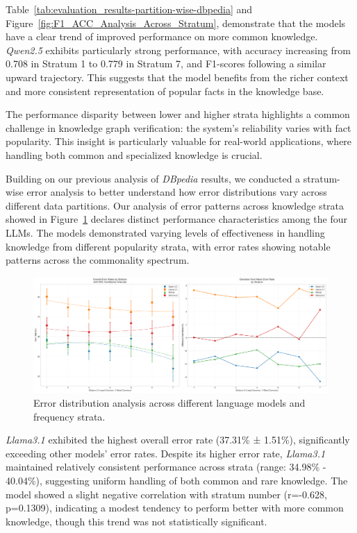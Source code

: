 Table~\ref{tab:evaluation_results-partition-wise-dbpedia} and Figure~\ref{fig:F1_ACC_Analysis_Across_Stratum}, demonstrate that the models have a clear trend of improved performance on more common knowledge.
\textit{Qwen2.5} exhibits particularly strong performance, with accuracy increasing from 0.708 in Stratum 1 to 0.779 in Stratum 7, and F1-scores following a similar upward trajectory.
This suggests that the model benefits from the richer context and more consistent representation of popular facts in the knowledge base.

The performance disparity between lower and higher strata highlights a common challenge in knowledge graph verification: the system's reliability varies with fact popularity.
This insight is particularly valuable for real-world applications, where handling both common and specialized knowledge is crucial.

Building on our previous analysis of \textit{DBpedia} results, we conducted a stratum-wise error analysis to better understand how error distributions vary across different data partitions.
Our analysis of error patterns across knowledge strata showed in Figure~\ref{fig:error_model-comparison_partition-wise} declares distinct performance characteristics among the four LLMs.
The models demonstrated varying levels of effectiveness in handling knowledge from different popularity strata, with error rates showing notable patterns across the commonality spectrum.

\begin{figure}[ht!]
    \centering
    \begin{minipage}[b]{\textwidth}
        \centering
        \includegraphics[width=\textwidth]{res/error_rates_analysis}
    \end{minipage}
    \caption{Error distribution analysis across different language models and frequency strata.}
    \label{fig:error_model-comparison_partition-wise}
\end{figure}

\textit{Llama3.1} exhibited the highest overall error rate (37.31\% ± 1.51\%), significantly exceeding other models' error rates.
Despite its higher error rate, \textit{Llama3.1} maintained relatively consistent performance across strata (range: 34.98\% - 40.04\%), suggesting uniform handling of both common and rare knowledge.
The model showed a slight negative correlation with stratum number (r=-0.628, p=0.1309), indicating a modest tendency to perform better with more common knowledge, though this trend was not statistically significant.

